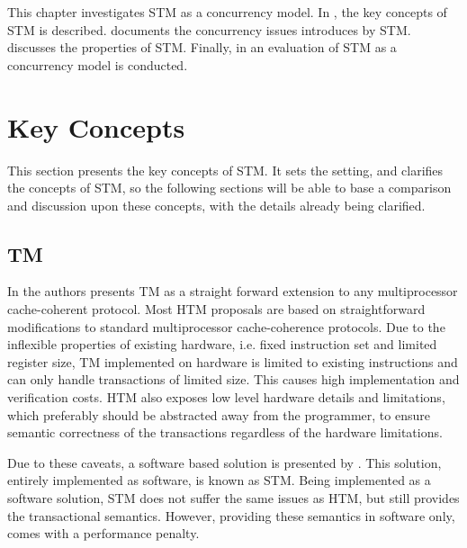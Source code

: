 \makeatletter {}\makeatother
{}
This chapter investigates \ac{STM} as a concurrency model. In , the key concepts of \ac{STM} is described.  documents the concurrency issues introduces by \ac{STM}.  discusses the properties of \ac{STM}. Finally, in  an evaluation of \ac{STM} as a concurrency model is conducted.
\label{chap:stm}

\section{Key Concepts}
\label{sec:stm_keyconcepts}
This section presents the key concepts of \ac{STM}. It sets the setting, and clarifies the concepts of \ac{STM}, so the following sections will be able to base a comparison and discussion upon these concepts, with the details already being clarified.

\subsection{\acl{TM}}
\label{sec:tmevo}
In \cite{herlihy1993transactional} the authors presents \ac{TM} as a straight forward extension to any multiprocessor cache-coherent protocol. Most \ac{HTM} proposals are based on straightforward modifications to standard multiprocessor cache-coherence protocols\cite{herlihy2011tm}. Due to the inflexible properties of existing hardware, i.e. fixed instruction set and limited register size, \ac{TM} implemented on hardware is limited to existing instructions and can only handle transactions of limited size\cite{dragojevic2011stm}. This causes high implementation and verification costs\cite{cascaval2008software}. \ac{HTM} also exposes low level hardware details and limitations\cite{herlihy2011tm}, which preferably should be abstracted away from the programmer, to ensure semantic correctness of the transactions regardless of the hardware limitations. 

Due to these caveats, a software based solution is presented by \cite{shavit1997software}. This solution, entirely implemented as software, is known as \acl{STM}. Being implemented as a software solution, \ac{STM} does not suffer the same issues as \ac{HTM}, but still provides the transactional semantics. However, providing these semantics in software only, comes with a performance penalty\cite{cascaval2008software}\cite{dragojevic2011stm}.

